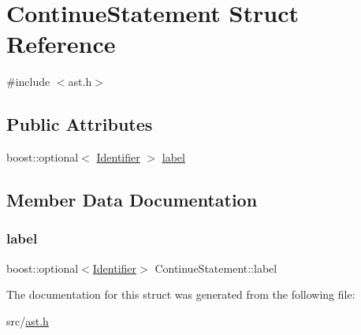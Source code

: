 \hypertarget{struct_continue_statement}{}\section{Continue\+Statement Struct Reference}
\label{struct_continue_statement}


{\ttfamily \#include $<$ast.\+h$>$}

\subsection*{Public Attributes}
\begin{DoxyCompactItemize}
\item 
boost\+::optional$<$ \hyperlink{struct_identifier}{Identifier} $>$ \hyperlink{struct_continue_statement_ac69a8f5dee8dc80f083162d8e8954edb}{label}
\end{DoxyCompactItemize}


\subsection{Member Data Documentation}
\mbox{\label{struct_continue_statement_ac69a8f5dee8dc80f083162d8e8954edb}} 
\subsubsection{\texorpdfstring{label}{label}}
{\footnotesize\ttfamily boost\+::optional$<$\hyperlink{struct_identifier}{Identifier}$>$ Continue\+Statement\+::label}



The documentation for this struct was generated from the following file\+:\begin{DoxyCompactItemize}
\item 
src/\hyperlink{ast_8h}{ast.\+h}\end{DoxyCompactItemize}
